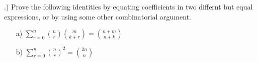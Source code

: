 \documentclass[12pt]{article}
\begin{document}
	\medskip
	.) Prove the following identities by equating coefficients in two differnt but equal expressions, or by using some other combinatorial argument.
	\begin{enumerate}
		\item[a)] $\displaystyle \sum_{r=0}^{n}{n \choose r}{m \choose k+r}={n+m \choose n+k}$
		\item[b)] $\displaystyle \sum_{r=0}^{n}{n \choose r}^{2}={2n \choose n}$
	\end{enumerate}
\end{document}
